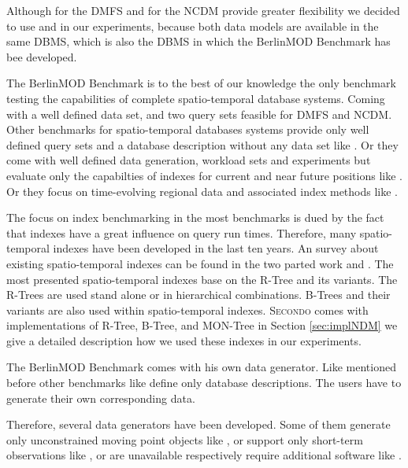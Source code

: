 \documentclass[a4paper]{article}
\newcommand{\secondo}{\textsc{Secondo}}
\newcommand{\bmodb} {BerlinMOD Benchmark}
\begin{document}
Although \cite{STAUPelekis} for the DMFS and \cite{DynamicTransportNetworkDing} for
the NCDM provide greater flexibility we decided to use
\cite{DataModelDataStructureGueting} and \cite{NetworkGueting} in our
experiments, because both data models are available in the same DBMS, which is
also the DBMS in which the \bmodb{} \cite{BerlinMODVLDBDuentgen} has bee developed.

The \bmodb{} \cite{BerlinMODVLDBDuentgen} is to the best of our knowledge the only
benchmark testing the capabilities of complete spatio-temporal database systems.
Coming with a well defined data set, and two query sets feasible for DMFS and NCDM.
Other benchmarks for spatio-temporal databases systems provide only well defined
query sets and a database description without any data set like 
\cite{QueriesTheodoridis}.
Or they come with well defined data generation, workload sets and experiments but
evaluate only the capabilties of indexes for current and near future positions like
\cite{COSTBenchmarkJensen}. Or they focus on time-evolving regional data and 
associated
index methods like \cite{BenchmarkTzouramanis}.

The focus on index benchmarking in the most benchmarks is dued by the fact that
indexes have a great influence on query run times. Therefore, many spatio-temporal
indexes have been developed in the last ten years. An survey about existing 
spatio-temporal
indexes can be found in the two parted work \cite{STAMSurvey1} and 
\cite{STAMSurvey2}.
The most presented spatio-temporal indexes base on the R-Tree \cite{RTreeGuttmann}
and its variants. The R-Trees are used stand alone or in hierarchical combinations.
B-Trees \cite{BTreeBayer} and their variants are also used within spatio-temporal
indexes. \secondo{} comes with implementations of R-Tree, B-Tree, and MON-Tree
\cite{MONTreeAlmeidaGeoinformatica} in Section \ref{sec:implNDM} we give a detailed
description how we used these indexes in our experiments.

The \bmodb{} comes with his own data generator. Like mentioned before other
benchmarks like \cite{QueriesTheodoridis} define only database descriptions.
The users have to generate their own corresponding data.

Therefore, several data generators have been developed. Some of them generate
only unconstrained moving point objects like \cite{OportoSaglio}, or support
only short-term observations like \cite{BrinkhoffsDataGenerator}, or are
unavailable respectively require additional software like \cite{STACTS}.
\end{document}
